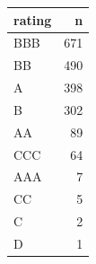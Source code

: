 \begin{tabular}{lr}
\toprule
rating & n \\
\midrule
BBB & 671 \\
BB & 490 \\
A & 398 \\
B & 302 \\
AA & 89 \\
CCC & 64 \\
AAA & 7 \\
CC & 5 \\
C & 2 \\
D & 1 \\
\bottomrule
\end{tabular}
